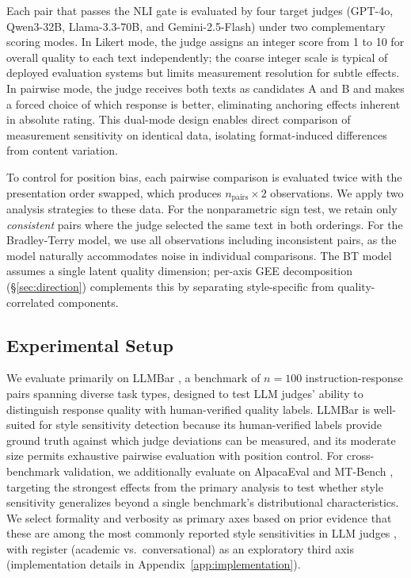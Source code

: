 Each pair that passes the NLI gate is evaluated by four target judges (GPT-4o, Qwen3-32B, Llama-3.3-70B, and Gemini-2.5-Flash) under two complementary scoring modes.
In Likert mode, the judge assigns an integer score from 1 to 10 for overall quality to each text independently; the coarse integer scale is typical of deployed evaluation systems but limits measurement resolution for subtle effects.
In pairwise mode, the judge receives both texts as candidates A and B and makes a forced choice of which response is better, eliminating anchoring effects inherent in absolute rating.
This dual-mode design enables direct comparison of measurement sensitivity on identical data, isolating format-induced differences from content variation.

To control for position bias, each pairwise comparison is evaluated twice with the presentation order swapped, which produces $n_{\text{pairs}} \times 2$ observations.
We apply two analysis strategies to these data.
For the nonparametric sign test, we retain only \emph{consistent} pairs where the judge selected the same text in both orderings.
For the Bradley-Terry model, we use all observations including inconsistent pairs, as the model naturally accommodates noise in individual comparisons.
The BT model assumes a single latent quality dimension; per-axis GEE decomposition (\S\ref{sec:direction}) complements this by separating style-specific from quality-correlated components.

\subsection{Experimental Setup}
\label{sec:setup}

We evaluate primarily on LLMBar \citep{zeng2023llmbar}, a benchmark of $n = 100$ instruction-response pairs spanning diverse task types, designed to test LLM judges' ability to distinguish response quality with human-verified quality labels.
LLMBar is well-suited for style sensitivity detection because its human-verified labels provide ground truth against which judge deviations can be measured, and its moderate size permits exhaustive pairwise evaluation with position control.
For cross-benchmark validation, we additionally evaluate on AlpacaEval \citep{dubois2023alpacafarm} and MT-Bench \citep{zheng2023judging}, targeting the strongest effects from the primary analysis to test whether style sensitivity generalizes beyond a single benchmark's distributional characteristics.
We select formality and verbosity as primary axes based on prior evidence that these are among the most commonly reported style sensitivities in LLM judges \citep{wu2023style,saito2023verbosity}, with register (academic vs.\ conversational) as an exploratory third axis (implementation details in Appendix~\ref{app:implementation}).

